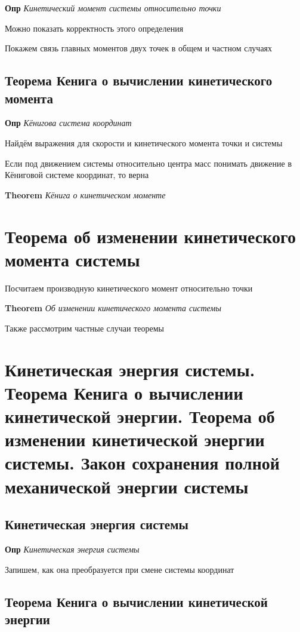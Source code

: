 \documentclass[a4paper, 14pt]{article}
\begin{document}
    \textbf{Опр} \textit{Кинетический момент системы относительно точки}
    
    Можно показать корректность этого определения
    
    Покажем связь главных моментов двух точек в общем и частном случаях
    
    \subsection{Теорема Кенига о вычислении кинетического момента}
    
    \textbf{Опр} \textit{Кёнигова система координат}
    
    Найдём выражения для скорости и кинетического момента точки и системы
    
    Если под движением системы относительно центра масс понимать движение в Кёниговой системе координат, то верна
    
    \textbf{Theorem} \textit{Кёнига о кинетическом моменте}
    
    \section{Теорема об изменении кинетического момента системы}
    
    Посчитаем производную кинетического момент относительно точки
    
    \textbf{Theorem} \textit{Об изменении кинетического момента системы}
    
    Также рассмотрим частные случаи теоремы
    
    \section{Кинетическая энергия системы.
    Теорема Кенига о вычислении кинетической энергии.
    Теорема об изменении кинетической энергии системы.
    Закон сохранения полной механической энергии системы}
    
    \subsection{Кинетическая энергия системы}
    
    \textbf{Опр} \textit{Кинетическая энергия системы}
    
    Запишем, как она преобразуется при смене системы координат
    
    \subsection{Теорема Кенига о вычислении кинетической энергии}
    
\end{document}
